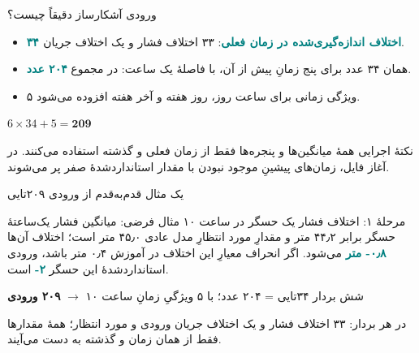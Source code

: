 \documentclass[aspectratio=169,11pt]{beamer}
\newcommand{\key}[1]{\textcolor{teal}{\textbf{#1}}}
\newcommand{\eng}[1]{\lr{#1}}
\begin{document}
\begin{frame}{ورودی آشکارساز دقیقاً چیست؟}
  \begin{itemize}
  \item \key{۳۴ اختلاف اندازه‌گیری‌شده در زمان فعلی}: ۳۳ اختلاف فشار و یک اختلاف جریان.
  \item همان ۳۴ عدد برای پنج زمانِ پیش از آن، با فاصلهٔ یک ساعت: در مجموع \key{۲۰۴ عدد}.
  \item ۵ ویژگی زمانی برای ساعت روز، روز هفته و آخر هفته افزوده می‌شود.
  \end{itemize}
  \begin{center}\Large\color{navy}$6\times 34+5=\mathbf{209}$\end{center}
  \begin{block}{نکتهٔ اجرایی}
  همهٔ میانگین‌ها و پنجره‌ها فقط از زمان فعلی و گذشته استفاده می‌کنند. در آغاز فایل، زمان‌های پیشینِ موجود نبودن با مقدار استانداردشدهٔ صفر پر می‌شوند.
  \end{block}
\end{frame}

\begin{frame}{یک مثال قدم‌به‌قدم از ورودی ۲۰۹تایی}
  \begin{block}{مرحلهٔ ۱: اختلاف فشار یک حسگر در ساعت ۱۰}
  مثال فرضی: میانگین فشار یک‌ساعتهٔ حسگر \eng{P1} برابر ۴۴٫۲ متر و مقدارِ مورد انتظارِ مدل عادی ۴۵٫۰ متر است؛ اختلاف آن‌ها \key{۰٫۸- متر} می‌شود. اگر انحراف معیارِ این اختلاف در آموزش ۰٫۴ متر باشد، ورودی استانداردشدهٔ این حسگر \key{۲-} است.
  \end{block}
  \begin{center}
  \end{center}
  \begin{center}\color{navy}\large شش بردار ۳۴تایی = ۲۰۴ عدد؛ با ۵ ویژگیِ زمانِ ساعت ۱۰ $\longrightarrow$ \textbf{۲۰۹ ورودی}\end{center}
  \small\color{gray}در هر بردار: ۳۳ اختلاف فشار و یک اختلاف جریان ورودی و مورد انتظار؛ همهٔ مقدارها فقط از همان زمان و گذشته به دست می‌آیند.
\end{frame}
\end{document}
